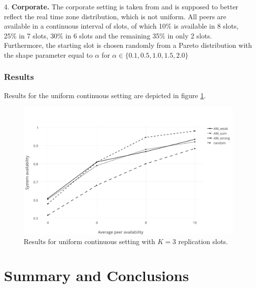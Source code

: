 \documentclass{pracamgren}
\begin{document}
4. {\bf Corporate.} The corporate setting is taken from \cite{krz} and is supposed to better reflect the real time zone distribution, which is not uniform. All peers are available in a continuous interval of slots, of which 10\% is available in 8 slots, 25\%  in 7 slots, 30\% in 6 slots and the remaining 35\% in only 2 slots. Furthermore, the starting slot is chosen randomly from a Pareto distribution with the shape parameter equal to $\alpha$ for $\alpha \in \{0.1, 0.5, 1.0, 1.5, 2.0\}$\\

\subsection{Results}

Results for the uniform continuous setting are depicted in figure \ref{uni_cont_3}.\\

\begin{figure}[h]
\centering
\includegraphics[scale=0.55]{uni_cont_3.pdf}
\caption{Results for uniform continuous setting with $K=3$ replication slots.}
\label{uni_cont_3}
\end{figure}
 

\chapter{Summary and Conclusions}\label{chap:conclusions}


%
%
%
%




\end{document}
